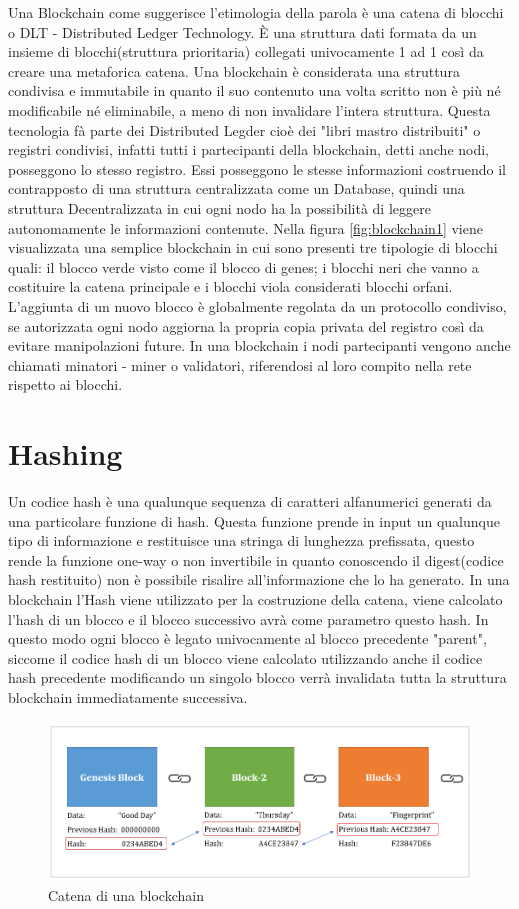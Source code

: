 \documentclass[11pt,a4paper,titlepage,twoside,openright]{report}
\begin{document}
Una Blockchain come suggerisce l'etimologia della parola è una catena di blocchi o DLT - Distributed Ledger Technology. È una struttura dati formata da un insieme di blocchi(struttura prioritaria) collegati univocamente 1 ad 1 così da creare una metaforica catena. Una blockchain è considerata una struttura condivisa e immutabile in quanto il suo contenuto una volta scritto non è più né modificabile né eliminabile, a meno di non invalidare l'intera struttura. Questa tecnologia fà parte dei Distributed Legder cioè dei "libri mastro distribuiti" o registri condivisi, infatti tutti i partecipanti della blockchain, detti anche nodi, posseggono lo stesso registro. Essi posseggono le stesse informazioni costruendo il contrapposto di una struttura centralizzata come un Database, quindi una struttura Decentralizzata in cui ogni nodo ha la possibilità di leggere autonomamente le informazioni contenute.
Nella figura \ref{fig:blockchain1} viene visualizzata una semplice blockchain in cui sono presenti tre tipologie di blocchi quali: il blocco verde visto come il blocco di genes; i blocchi neri che vanno a costituire la catena principale e i blocchi viola considerati blocchi orfani. L'aggiunta di un nuovo blocco è globalmente regolata da un protocollo condiviso, se autorizzata ogni nodo aggiorna la propria copia privata del registro così da evitare manipolazioni future. In una blockchain i nodi partecipanti vengono anche chiamati minatori - miner o validatori, riferendosi al loro compito nella rete rispetto ai blocchi.

\section{Hashing}
Un codice hash è una qualunque sequenza di caratteri alfanumerici generati da una particolare funzione di hash. Questa funzione prende in input un qualunque tipo di informazione e restituisce una stringa di lunghezza prefissata, questo rende la funzione one-way o non invertibile in quanto conoscendo il digest(codice hash restituito) non è possibile risalire all'informazione che lo ha generato. In una blockchain l'Hash viene utilizzato per la costruzione della catena, viene calcolato l'hash di un blocco e il blocco successivo avrà come parametro questo hash. In questo modo ogni blocco è legato univocamente al blocco precedente "parent", siccome il codice hash di un blocco viene calcolato utilizzando anche il codice hash precedente modificando un singolo blocco verrà invalidata tutta la struttura blockchain immediatamente successiva.
\begin{figure}[h]
	\includegraphics[width=\textwidth]{bc1}
	\centering
	\caption{Catena di una blockchain}
	\label{fig:blockchain2}
\end{figure}
\end{document}
